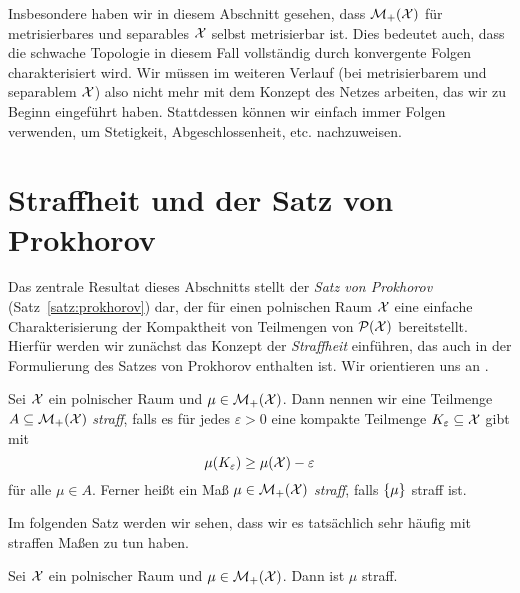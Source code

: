 \documentclass[../thesis/thesis.tex]{subfiles}
\begin{document}
	Insbesondere haben wir in diesem Abschnitt gesehen, dass $\mathcal{M}_{+}(\mathcal{X})$ für metrisierbares und separables $\mathcal{X}$ selbst metrisierbar ist. Dies bedeutet auch, dass die schwache Topologie
	in diesem Fall vollständig durch konvergente Folgen charakterisiert wird. Wir müssen im weiteren Verlauf (bei metrisierbarem und separablem $\mathcal{X}$) also nicht mehr mit dem Konzept des Netzes arbeiten, das wir zu Beginn eingeführt haben. Stattdessen
	können wir einfach immer Folgen verwenden, um Stetigkeit, Abgeschlossenheit, etc. nachzuweisen.

	\section{Straffheit und der Satz von Prokhorov}
	\label{subsec:straffheit_prokhorov}
	
	Das zentrale Resultat dieses Abschnitts stellt der \emph{Satz von Prokhorov} (Satz~\ref{satz:prokhorov}) dar, der für einen polnischen Raum $\mathcal{X}$ eine einfache Charakterisierung der Kompaktheit von Teilmengen von $\mathcal{P}(\mathcal{X})$ bereitstellt. Hierfür werden wir zunächst das Konzept der \emph{Straffheit} einführen, das auch in der Formulierung des Satzes von Prokhorov enthalten ist.
	Wir orientieren uns an \cite[Kapitel 4.14]{Simon.2015}.
	
	\begin{Definition}
		Sei $\mathcal{X}$ ein polnischer Raum und $\mu \in \mathcal{M}_{+}(\mathcal{X})$. Dann nennen wir 
		eine Teilmenge $A \subseteq \mathcal{M}_{+}(\mathcal{X})$ \emph{straff}, falls es für jedes $\varepsilon > 0$ eine kompakte Teilmenge
		$K_\varepsilon \subseteq \mathcal{X}$ gibt mit 
		\[ \mu(K_\varepsilon) \geq \mu(\mathcal{X})  - \varepsilon \]
		für alle $\mu \in A$.
		Ferner heißt ein Maß $\mu \in \mathcal{M}_{+}(\mathcal{X})$ \emph{straff}, falls $\left\{\mu\right\}$ straff ist.
	\end{Definition}
	
	Im folgenden Satz werden wir sehen, dass wir es tatsächlich sehr häufig mit straffen Maßen zu tun haben.
	
	\begin{Satz}
		\label{satz:straffheit}
		Sei $\mathcal{X}$ ein polnischer Raum und $\mu \in \mathcal{M}_{+}(\mathcal{X})$. Dann ist $\mu$ straff.
	\end{Satz}
	
\end{document}
